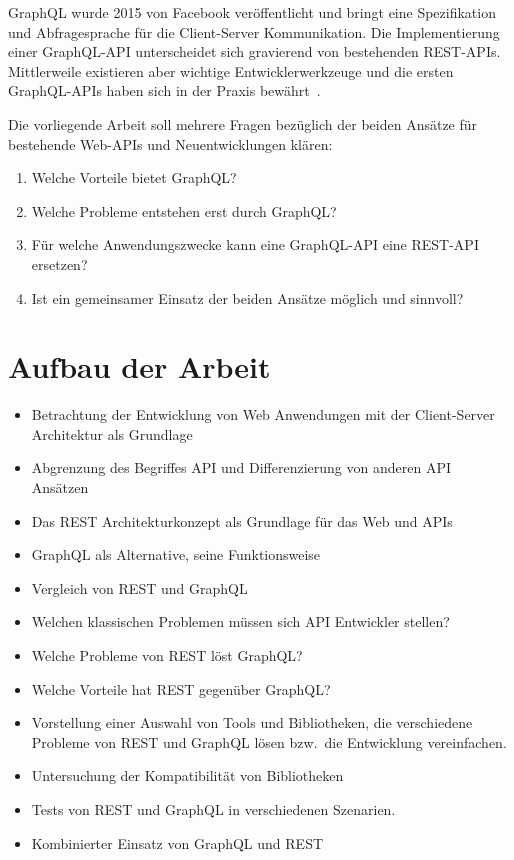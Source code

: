 \par
GraphQL wurde 2015 von Facebook veröffentlicht und bringt eine Spezifikation und Abfragesprache für die Client-Server Kommunikation.
Die Implementierung einer GraphQL-API unterscheidet sich gravierend von bestehenden REST-APIs.
Mittlerweile existieren aber wichtige Entwicklerwerkzeuge und die ersten GraphQL-APIs haben sich in der Praxis bewährt~\cite[vgl.][]{GitHubAPI}.
\par
Die vorliegende Arbeit soll mehrere Fragen bezüglich der beiden Ansätze für bestehende Web-APIs und Neuentwicklungen klären:
\begin{enumerate}
  \item Welche Vorteile bietet GraphQL\@?
  \item Welche Probleme entstehen erst durch GraphQL\@?
  \item Für welche Anwendungszwecke kann eine GraphQL-API eine REST-API ersetzen?
  \item Ist ein gemeinsamer Einsatz der beiden Ansätze möglich und sinnvoll?
\end{enumerate}

\section{Aufbau der Arbeit}
\begin{itemize}
  \item Betrachtung der Entwicklung von Web Anwendungen mit der Client-Server Architektur als Grundlage
  \item Abgrenzung des Begriffes API und Differenzierung von anderen API Ansätzen
  \item Das REST Architekturkonzept als Grundlage für das Web und APIs
  \item GraphQL als Alternative, seine Funktionsweise
  \item Vergleich von REST und GraphQL
  \item Welchen klassischen Problemen müssen sich API Entwickler stellen?
  \item Welche Probleme von REST löst GraphQL\@?
  \item Welche Vorteile hat REST gegenüber GraphQL\@?
  \item Vorstellung einer Auswahl von Tools und Bibliotheken, die verschiedene Probleme von REST und GraphQL lösen bzw.\ die Entwicklung vereinfachen.
  \item Untersuchung der Kompatibilität von Bibliotheken
  \item Tests von REST und GraphQL in verschiedenen Szenarien.
  \item Kombinierter Einsatz von GraphQL und REST
\end{itemize}